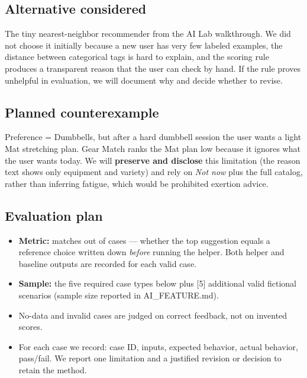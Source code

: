 \documentclass[11pt]{article}
\newcommand{\ph}[1]{\textcolor{ph}{[#1]}}
\begin{document}
\subsection*{Alternative considered}
The tiny nearest-neighbor recommender from the AI Lab walkthrough. We did not choose it initially because a new user has very few labeled examples, the distance between categorical tags is hard to explain, and the scoring rule produces a transparent reason that the user can check by hand. If the rule proves unhelpful in evaluation, we will document why and decide whether to revise.

\subsection*{Planned counterexample}
Preference = Dumbbells, but after a hard dumbbell session the user wants a light Mat stretching plan. Gear Match ranks the Mat plan low because it ignores what the user wants today. We will \textbf{preserve and disclose} this limitation (the reason text shows only equipment and variety) and rely on \emph{Not now} plus the full catalog, rather than inferring fatigue, which would be prohibited exertion advice.

\subsection*{Evaluation plan}
\begin{itemize}
  \item \textbf{Metric:} matches out of cases --- whether the top suggestion equals a reference choice written down \emph{before} running the helper. Both helper and baseline outputs are recorded for each valid case.
  \item \textbf{Sample:} the five required case types below plus \ph{5} additional valid fictional scenarios (sample size reported in AI\_FEATURE.md).
  \item No-data and invalid cases are judged on correct feedback, not on invented scores.
  \item For each case we record: case ID, inputs, expected behavior, actual behavior, pass/fail. We report one limitation and a justified revision or decision to retain the method.
\end{itemize}
\end{document}
